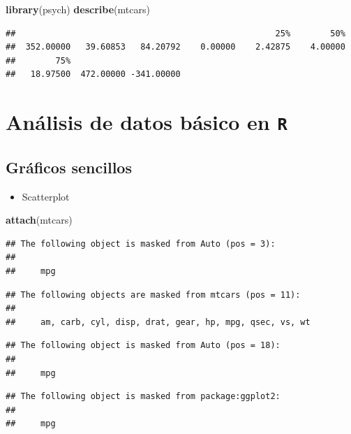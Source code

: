 \documentclass[]{book}
\newenvironment{Shaded}{\begin{snugshade}}{\end{snugshade}}
\newcommand{\KeywordTok}[1]{\textcolor[rgb]{0.13,0.29,0.53}{\textbf{#1}}}
\newcommand{\NormalTok}[1]{#1}
\providecommand{\tightlist}{%
  \setlength{\itemsep}{0pt}\setlength{\parskip}{0pt}}
\begin{document}
\begin{Shaded}
\begin{Highlighting}[]
\KeywordTok{library}\NormalTok{(psych)}
\KeywordTok{describe}\NormalTok{(mtcars)}
\end{Highlighting}
\end{Shaded}

\begin{verbatim}
##                                                    25%        50% 
##  352.00000   39.60853   84.20792    0.00000    2.42875    4.00000 
##        75%                       
##   18.97500  472.00000 -341.00000
\end{verbatim}

\chapter{\texorpdfstring{Análisis de datos básico en
\texttt{R}}{Análisis de datos básico en R}}\label{basic}

\section{Gráficos sencillos}\label{gruxe1ficos-sencillos}

\begin{itemize}
\tightlist
\item
  Scatterplot
\end{itemize}

\begin{Shaded}
\begin{Highlighting}[]
\KeywordTok{attach}\NormalTok{(mtcars)}
\end{Highlighting}
\end{Shaded}

\begin{verbatim}
## The following object is masked from Auto (pos = 3):
## 
##     mpg
\end{verbatim}

\begin{verbatim}
## The following objects are masked from mtcars (pos = 11):
## 
##     am, carb, cyl, disp, drat, gear, hp, mpg, qsec, vs, wt
\end{verbatim}

\begin{verbatim}
## The following object is masked from Auto (pos = 18):
## 
##     mpg
\end{verbatim}

\begin{verbatim}
## The following object is masked from package:ggplot2:
## 
##     mpg
\end{verbatim}
\end{document}
